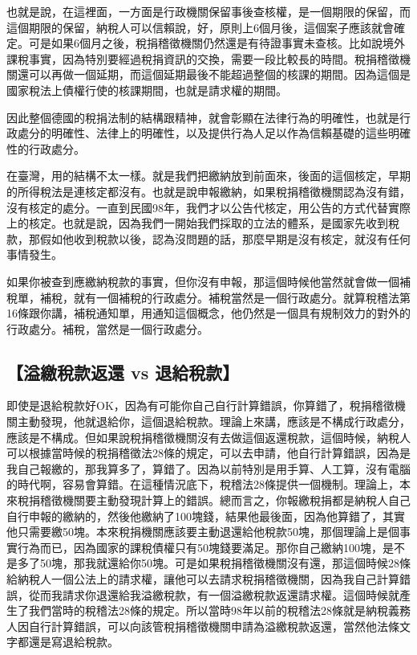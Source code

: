 \documentclass[oneside,sub3section]{ctexbook}
\begin{document}
也就是說，在這裡面，一方面是行政機關保留事後查核權，是一個期限的保留，而這個期限的保留，納稅人可以信賴說，好，原則上6個月後，這個案子應該就會確定。可是如果6個月之後，稅捐稽徵機關仍然還是有待證事實未查核。比如說境外課稅事實，因為特別要經過稅捐資訊的交換，需要一段比較長的時間。稅捐稽徵機關還可以再做一個延期，而這個延期最後不能超過整個的核課的期間。因為這個是國家稅法上債權行使的核課期間，也就是請求權的期間。

因此整個德國的稅捐法制的結構跟精神，就會彰顯在法律行為的明確性，也就是行政處分的明確性、法律上的明確性，以及提供行為人足以作為信賴基礎的這些明確性的行政處分。

在臺灣，用的結構不太一樣。就是我們把繳納放到前面來，後面的這個核定，早期的所得稅法是連核定都沒有。也就是說申報繳納，如果稅捐稽徵機關認為沒有錯，沒有核定的處分。一直到民國98年，我們才以公告代核定，用公告的方式代替實際上的核定。也就是說，因為我們一開始我們採取的立法的體系，是國家先收到稅款，那假如他收到稅款以後，認為沒問題的話，那麼早期是沒有核定，就沒有任何事情發生。

如果你被查到應繳納稅款的事實，但你沒有申報，那這個時候他當然就會做一個補稅單，補稅，就有一個補稅的行政處分。補稅當然是一個行政處分。就算稅稽法第16條跟你講，補稅通知單，用通知這個概念，他仍然是一個具有規制效力的對外的行政處分。補稅，當然是一個行政處分。

\hypertarget{ux6ea2ux7e73ux7a05ux6b3eux8fd4ux9084-vs-ux9000ux7d66ux7a05ux6b3e}{%
\subsection{【溢繳稅款返還 vs 退給稅款】}\label{ux6ea2ux7e73ux7a05ux6b3eux8fd4ux9084-vs-ux9000ux7d66ux7a05ux6b3e}}

即使是退給稅款好OK，因為有可能你自己自行計算錯誤，你算錯了，稅捐稽徵機關主動發現，他就退給你，這個退給稅款。理論上來講，應該是不構成行政處分，應該是不構成。但如果說稅捐稽徵機關沒有去做這個返還稅款，這個時候，納稅人可以根據當時候的稅捐稽徵法28條的規定，可以去申請，他自行計算錯誤，因為是我自己報繳的，那我算多了，算錯了。因為以前特別是用手算、人工算，沒有電腦的時代啊，容易會算錯。在這種情況底下，稅稽法28條提供一個機制。理論上，本來稅捐稽徵機關要主動發現計算上的錯誤。總而言之，你報繳稅捐都是納稅人自己自行申報的繳納的，然後他繳納了100塊錢，結果他最後面，因為他算錯了，其實他只需要繳50塊。本來稅捐機關應該要主動退還給他稅款50塊，那個理論上是個事實行為而已，因為國家的課稅債權只有50塊錢要滿足。那你自己繳納100塊，是不是多了50塊，那我就還給你50塊。可是如果稅捐稽徵機關沒有還，那這個時候28條給納稅人一個公法上的請求權，讓他可以去請求稅捐稽徵機關，因為我自己計算錯誤，從而我請求你退還給我溢繳稅款，有一個溢繳稅款返還請求權。這個時候就產生了我們當時的稅稽法28條的規定。所以當時98年以前的稅稽法28條就是納稅義務人因自行計算錯誤，可以向該管稅捐稽徵機關申請為溢繳稅款返還，當然他法條文字都還是寫退給稅款。
\end{document}
